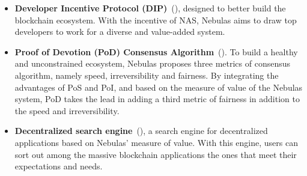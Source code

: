 {\begin{itemize}
	\item \textbf{Developer Incentive Protocol (DIP)}~(), designed to better build the blockchain ecosystem. With the incentive of NAS, Nebulas aims to draw top developers to work for a diverse and value-added system.

  \item \textbf{Proof of Devotion (PoD) Consensus Algorithm}~(). To build a healthy and unconstrained ecosystem, Nebulas proposes three metrics of consensus algorithm, namely speed, irreversibility and fairness. By integrating the advantages of PoS and PoI, and based on the measure of value of the Nebulas system, PoD takes the lead in adding a third metric of fairness in addition to the speed and irreversibility.

  \item \textbf{Decentralized search engine}~(), a search engine for decentralized applications based on Nebulas’ measure of value. With this engine, users can sort out among the massive blockchain applications the ones that meet their expectations and needs.

\end{itemize}
}
